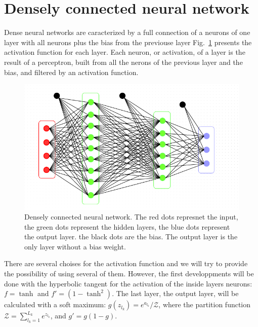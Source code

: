 \documentclass[final, paper=letter,5p,times,twocolumn]{elsarticle}
\begin{document}
 
\section{Densely connected neural network}

Dense neural networks are caracterized by a full connection of a neurons of one layer with all neurons plus the bias from the previouse layer Fig.~\ref{fig:Densely_connected_neural_network} presents the activation function for each layer. Each neuron, or activation, of a layer is the result of a perceptron, built from all the nerons of the previous layer and the bias, and filtered by an activation function. 


\begin{figure}[htbp]
   \begin{center}
      \includegraphics[scale=0.3, angle=0]{images/densely_connected_nn.png}
   \end{center}
   \caption{Densely connected neural network. The red dots represnet the input, the green dots represent the hidden layers, the blue dots represent the output layer. the black dots are the bias. The output layer is the only layer without a bias weight.}
  \label{fig:Densely_connected_neural_network} 
\end{figure}


  There are several choises for the activation function and we will try to provide the possibility of using several of them. However, the first developpments will be done with the hyperbolic tangent for the activation of the inside layers neurons: $f = \tanh$ and $f' = (1 - \tanh^{2})$. The last layer, the output layer, will be calculated with a soft maximum: $g(z_{l_{k}}) = e^{a_{l_{k}}} / \mathcal{Z}$, where the partition function $\mathcal{Z} = \sum_{l_{k} = 1}^{L_{k}} e^{z_{l_{k}}}$, and $g' = g(1 - g)$.
  
\end{document}
